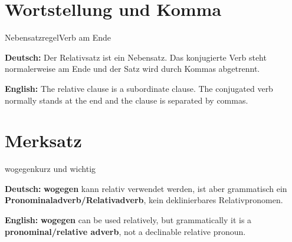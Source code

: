 \documentclass[a4paper,11pt]{article}
\newcommand{\GermanText}[1]{\textbf{Deutsch: }#1\par}
\newcommand{\EnglishText}[1]{{\small\color{SoftGray}\textbf{English: }#1\par}}
\begin{document}
\section{Wortstellung und Komma}

\begin{grammarentry}{Nebensatzregel}{Verb am Ende}

\GermanText{Der Relativsatz ist ein Nebensatz. Das konjugierte Verb steht normalerweise am Ende und der Satz wird durch Kommas abgetrennt.}

\EnglishText{The relative clause is a subordinate clause. The conjugated verb normally stands at the end and the clause is separated by commas.}

\end{grammarentry}

\section{Merksatz}

\begin{grammarentry}{wogegen}{kurz und wichtig}

\GermanText{\textbf{wogegen} kann relativ verwendet werden, ist aber grammatisch ein \textbf{Pronominaladverb/Relativadverb}, kein deklinierbares Relativpronomen.}

\EnglishText{\textbf{wogegen} can be used relatively, but grammatically it is a \textbf{pronominal/relative adverb}, not a declinable relative pronoun.}

\end{grammarentry}
\end{document}
